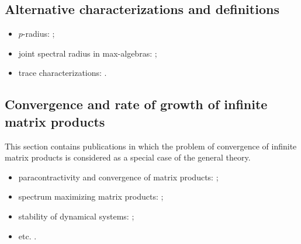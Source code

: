\documentclass[a4paper,fleqn]{article}
\let\cite=\citep
\begin{document}
\subsection*{Alternative characterizations and definitions}
\begin{itemize}
  \item $p$-radius: \cite{BhaBha:SM95, JP:CDC10, JunProt:SIAMJSC11,
          Morris:SIAMJMAA22, OgurJung:CDC14, OgurMart:LAA14, OPJ:SCL16,
          Prot:LAA08, Prot:CDC05:2, Muller:APM97, Morris:AM16};
  \item joint spectral radius in max-algebras: \cite{Bapat:LAA98,
          BGT:IEEETAC00, DGM:LIPICS17, Gaubert:IEEETAC95, GMW:LAA17,
          GurMas:LAA11, Lur:LAA05, Lur:LAA06:1, LurYang:LAA09, MulPep:LAA13,
          Pep:LAA08, Pep:LAA11};
  \item trace characterizations: \cite{ChenZhou:LAA00, Xu:EJLA10}.
\end{itemize}

\subsection*{Convergence and rate of growth of infinite matrix products}
This section contains publications in which the problem of convergence
of infinite matrix products is considered as a special case of the
general theory.

\begin{itemize}
  \item paracontractivity and convergence of matrix products: \cite{BeynEls96,
          BE:EJLA97, NeuSch:ArXiv98, VEB:LAA00, Mojskerc:LAA14, WangCheng:LMA16};
  \item spectrum maximizing matrix products: \cite{BochiLas:SAIMJMAA24,
          CGSZ:LAA10, JSRpack, GugProt:SIAMJMAA16, GugZen:LAA08, Koz:SAIMJMAA25,
          Laskawiec:LAA25, Laskawiec:PhD25, Vladimirov:ArXiv24};
  \item stability of dynamical systems: \cite{Ahmadi08, AhmPar:CDC05,
          Bar:CDC05, BrayTong:TCS79, BrayTong:TCS80, GugZen:LNM14,
          Koz:AiT90:10:e, AKKK:92:e, ShihWP:LAA97, SBKK:CDC97, Shih:LAA99,
          KasBh:2000, BTV:MTNS02};
  \item etc. \cite{AndoShih:SIAM:98, BerWang:LAA92, BEN:ETNA94, CiconePhD11,
          Cohen:MPCPS79, DaubLag:LAA92, DaubLag:LAA01, EF:LAA97, FLS:ETDS19,
          GugZen:LAA01, GurRod:SIAMJMAA97, GugZen:LAA03, Hajnal:MPCPS76,
          Hartfiel02, Holtz:EJLA00, HR:APM12, Koz:DDNS18, Koz:ArXiv20,
          Mate:PAMS98, Mate:FM99, NSch:LAA99, PJ:LAA13, Shen:LAA00,
          ShihPang:AJIFAC08, SU:SIAMJMAA94, Thomas:Arxiv18, Thomas:ArXiv22,
          Vlad:ArXiv16}.
\end{itemize}
\end{document}
